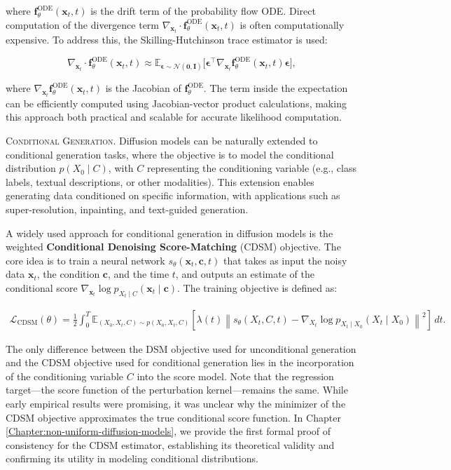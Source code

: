 \noindent where \( \mathbf{f}_\theta^{\text{ODE}}(\mathbf{x}_t, t) \) is the drift term of the probability flow ODE. Direct computation of the divergence term \( \nabla_{\mathbf{x}_t} \cdot \mathbf{f}_\theta^{\text{ODE}}(\mathbf{x}_t, t) \) is often computationally expensive. To address this, the Skilling-Hutchinson trace estimator is used:

\[
\nabla_{\mathbf{x}_t} \cdot \mathbf{f}_\theta^{\text{ODE}}(\mathbf{x}_t, t) \approx \mathbb{E}_{\mathbf{\epsilon} \sim \mathcal{N}(\mathbf{0}, \mathbf{I})} \big[ \mathbf{\epsilon}^\top \nabla_{\mathbf{x}_t} \mathbf{f}_\theta^{\text{ODE}}(\mathbf{x}_t, t) \mathbf{\epsilon} \big],
\]

\noindent where \( \nabla_{\mathbf{x}_t} \mathbf{f}_\theta^{\text{ODE}}(\mathbf{x}_t, t) \) is the Jacobian of \( \mathbf{f}_\theta^{\text{ODE}} \). The term inside the expectation can be efficiently computed using Jacobian-vector product calculations, making this approach both practical and scalable for accurate likelihood computation.


\textsc{Conditional Generation.} Diffusion models can be naturally extended to conditional generation tasks, where the objective is to model the conditional distribution \( p(X_0 \mid C) \), with \( C \) representing the conditioning variable (e.g., class labels, textual descriptions, or other modalities). This extension enables generating data conditioned on specific information, with applications such as super-resolution, inpainting, and text-guided generation.

A widely used approach for conditional generation in diffusion models is the weighted \textbf{Conditional Denoising Score-Matching} (CDSM) objective. The core idea is to train a neural network \( s_\theta(\mathbf{x}_t, \mathbf{c}, t) \) that takes as input the noisy data \( \mathbf{x}_t \), the condition \( \mathbf{c} \), and the time \( t \), and outputs an estimate of the conditional score \( \nabla_{\mathbf{x}_t} \log p_{X_t \mid C}(\mathbf{x}_t \mid \mathbf{c}) \). The training objective is defined as:

\begin{align}
    \mathcal{L}_{\text{CDSM}}(\theta) = 
    \frac{1}{2} \int_0^T \mathbb{E}_{(X_0, X_t, C) \sim p(X_0, X_t, C)} 
    \left[ \lambda(t) \left\| s_\theta(X_t, C, t) - \nabla_{X_t} \log p_{X_t \mid X_0}(X_t \mid X_0) \right\|^2 \right] \, dt.
\end{align}

The only difference between the DSM objective used for unconditional generation and the CDSM objective used for conditional generation lies in the incorporation of the conditioning variable \( C \) into the score model. Note that the regression target—the score function of the perturbation kernel—remains the same. While early empirical results were promising, it was unclear why the minimizer of the CDSM objective approximates the true conditional score function. In Chapter \ref{Chapter:non-uniform-diffusion-models}, we provide the first formal proof of consistency for the CDSM estimator, establishing its theoretical validity and confirming its utility in modeling conditional distributions.


